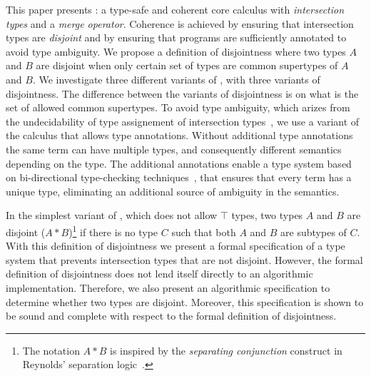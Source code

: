 This paper presents \name: a type-safe and coherent core calculus with
\emph{intersection types} and a \emph{merge operator}. Coherence is
achieved by ensuring that intersection types are \emph{disjoint} and
by ensuring that programs are sufficiently annotated to avoid type
ambiguity.  We propose a definition of disjointness where two types
$A$ and $B$ are disjoint when only certain set of types are common
supertypes of $A$ and $B$. We investigate three different variants of
\name, with three variants of disjointness. The difference between the 
variants of disjointness is on what is the set of allowed
common supertypes. To avoid type ambiguity, which arizes from the
undecidability of type assignement of intersection
types~\cite{vanBakel92}, we use a variant of the calculus that allows type
annotations. Without additional type annotations the same term can have
multiple types, and consequently different semantics depending on the
type. The additional annotations enable a type system based on 
bi-directional type-checking techniques~\cite{Pierce00local,Dunfield04tri}, that ensures that 
every term has a unique type, eliminating an additional source of ambiguity in
the semantics.

In the simplest variant of \name, which does not allow $\top$ types,
two types $A$ and $B$ are disjoint ($A * B$)\footnote{The notation $A
  * B$ is inspired by the \emph{separating conjunction} construct in
  Reynolds' separation logic~\cite{reynolds2002separation}.} if there
is no type $C$ such that both $A$ and $B$ are subtypes of
$C$. 
With this definition of disjointness we present a formal specification
of a type system that prevents intersection types that are not
disjoint. However, the formal definition of disjointness does not lend
itself directly to an algorithmic implementation.  Therefore, we also
present an algorithmic specification to determine whether two types
are disjoint. Moreover, this specification is shown to be sound and
complete with respect to the formal definition of disjointness.

